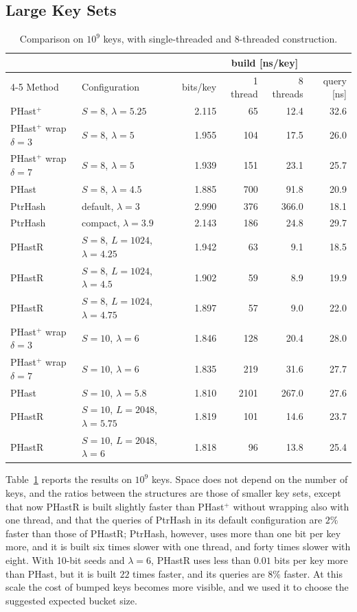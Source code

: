 \documentclass[11pt]{article}
\newcommand{\PHast}{PHast\xspace}
\newcommand{\PHastP}{PHast$^+$\xspace}
\newcommand{\PHastR}{PHastR\xspace}
\begin{document}
\subsection{Large Key Sets}
\label{sec:large}

\begin{table}[t]
\centering
\caption{Comparison on $10^9$ keys, with single-threaded and 8-threaded
construction.}
\label{tab:1e9}
\small
\begin{tabular}{llrrrr}
\toprule
& & & \multicolumn{2}{c}{build [ns/key]} & \\
\cmidrule(lr){4-5}
Method & Configuration & bits/key & 1 thread & 8 threads & query [ns] \\
\midrule
\PHastP & $S=8$, $\lambda=5.25$ & 2.115 & 65 & 12.4 & 32.6 \\
\PHastP wrap $\delta=3$ & $S=8$, $\lambda=5$ & 1.955 & 104 & 17.5 & 26.0 \\
\PHastP wrap $\delta=7$ & $S=8$, $\lambda=5$ & 1.939 & 151 & 23.1 & 25.7 \\
\PHast & $S=8$, $\lambda=4.5$ & 1.885 & 700 & 91.8 & 20.9 \\
PtrHash & default, $\lambda=3$ & 2.990 & 376 & 366.0 & 18.1 \\
PtrHash & compact, $\lambda=3.9$ & 2.143 & 186 & 24.8 & 29.7 \\
\addlinespace
\PHastR & $S=8$, $L=1024$, $\lambda=4.25$ & 1.942 & 63 & 9.1 & 18.5 \\
\PHastR & $S=8$, $L=1024$, $\lambda=4.5$ & 1.902 & 59 & 8.9 & 19.9 \\
\PHastR & $S=8$, $L=1024$, $\lambda=4.75$ & 1.897 & 57 & 9.0 & 22.0 \\
\midrule
\PHastP wrap $\delta=3$ & $S=10$, $\lambda=6$ & 1.846 & 128 & 20.4 & 28.0 \\
\PHastP wrap $\delta=7$ & $S=10$, $\lambda=6$ & 1.835 & 219 & 31.6 & 27.7 \\
\PHast & $S=10$, $\lambda=5.8$ & 1.810 & 2101 & 267.0 & 27.6 \\
\addlinespace
\PHastR & $S=10$, $L=2048$, $\lambda=5.75$ & 1.819 & 101 & 14.6 & 23.7 \\
\PHastR & $S=10$, $L=2048$, $\lambda=6$ & 1.818 & 96 & 13.8 & 25.4 \\
\bottomrule
\end{tabular}
\end{table}

Table~\ref{tab:1e9} reports the results on $10^9$ keys. Space does not depend
on the number of keys, and the ratios between the structures are those of
smaller key sets, except that now \PHastR is built slightly faster than
\PHastP without wrapping also with one thread, and that the queries of
PtrHash in its default configuration are $2\%$ faster than those of
\PHastR; PtrHash, however, uses more than one bit per key more, and it is
built six times slower with one thread, and forty times slower with eight.
With 10-bit seeds and
$\lambda=6$, \PHastR uses less than $0.01$ bits per key more than \PHast,
but it is built $22$ times faster, and its queries are $8\%$ faster. At this
scale the cost of bumped keys becomes more visible, and we used it to choose
the suggested expected bucket size.
\end{document}

